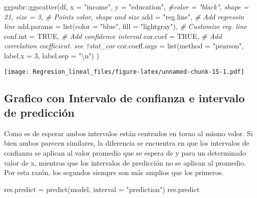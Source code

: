 \documentclass[
]{article}
\newenvironment{Shaded}{\begin{snugshade}}{\end{snugshade}}
\newcommand{\AttributeTok}[1]{\textcolor[rgb]{0.77,0.63,0.00}{#1}}
\newcommand{\CommentTok}[1]{\textcolor[rgb]{0.56,0.35,0.01}{\textit{#1}}}
\newcommand{\ConstantTok}[1]{\textcolor[rgb]{0.00,0.00,0.00}{#1}}
\newcommand{\DecValTok}[1]{\textcolor[rgb]{0.00,0.00,0.81}{#1}}
\newcommand{\FunctionTok}[1]{\textcolor[rgb]{0.00,0.00,0.00}{#1}}
\newcommand{\NormalTok}[1]{#1}
\newcommand{\OtherTok}[1]{\textcolor[rgb]{0.56,0.35,0.01}{#1}}
\newcommand{\SpecialCharTok}[1]{\textcolor[rgb]{0.00,0.00,0.00}{#1}}
\newcommand{\StringTok}[1]{\textcolor[rgb]{0.31,0.60,0.02}{#1}}
\begin{document}
\begin{Shaded}
\begin{Highlighting}[]
\NormalTok{ggpubr}\SpecialCharTok{::}\FunctionTok{ggscatter}\NormalTok{(df, }\AttributeTok{x =} \StringTok{"income"}\NormalTok{, }\AttributeTok{y =} \StringTok{"education"}\NormalTok{,}
   \CommentTok{\#color = "black", shape = 21, size = 3, \# Points color, shape and size}
   \AttributeTok{add =} \StringTok{"reg.line"}\NormalTok{,  }\CommentTok{\# Add regressin line}
   \AttributeTok{add.params =} \FunctionTok{list}\NormalTok{(}\AttributeTok{color =} \StringTok{"blue"}\NormalTok{, }\AttributeTok{fill =} \StringTok{"lightgray"}\NormalTok{), }\CommentTok{\# Customize reg. line}
   \AttributeTok{conf.int =} \ConstantTok{TRUE}\NormalTok{, }\CommentTok{\# Add confidence interval}
   \AttributeTok{cor.coef =} \ConstantTok{TRUE}\NormalTok{, }\CommentTok{\# Add correlation coefficient. see ?stat\_cor}
   \AttributeTok{cor.coeff.args =} \FunctionTok{list}\NormalTok{(}\AttributeTok{method =} \StringTok{"pearson"}\NormalTok{, }\AttributeTok{label.x =} \DecValTok{3}\NormalTok{, }\AttributeTok{label.sep =} \StringTok{"}\SpecialCharTok{\textbackslash{}n}\StringTok{"}\NormalTok{)}
\NormalTok{   )}
\end{Highlighting}
\end{Shaded}

\texttt{[image: Regresion\_lineal\_files/figure-latex/unnamed-chunk-15-1.pdf]}

\hypertarget{grafico-con-intervalo-de-confianza-e-intervalo-de-predicciuxf3n}{%
\subsection{Grafico con Intervalo de confianza e intervalo de
predicción}\label{grafico-con-intervalo-de-confianza-e-intervalo-de-predicciuxf3n}}

Como es de esperar ambos intervalos están centrados en torno al mismo
valor. Si bien ambos parecen similares, la diferencia se encuentra en
que los intervalos de confianza se aplican al valor promedio que se
espera de y para un determinado valor de x, mientras que los intervalos
de predicción no se aplican al promedio. Por esta razón, los segundos
siempre son más amplios que los primeros.

\begin{Shaded}
\begin{Highlighting}[]
\NormalTok{res.predict }\OtherTok{=} \FunctionTok{predict}\NormalTok{(model, }\AttributeTok{interval =} \StringTok{"prediction"}\NormalTok{)}
\NormalTok{res.predict}
\end{Highlighting}
\end{Shaded}
\end{document}
